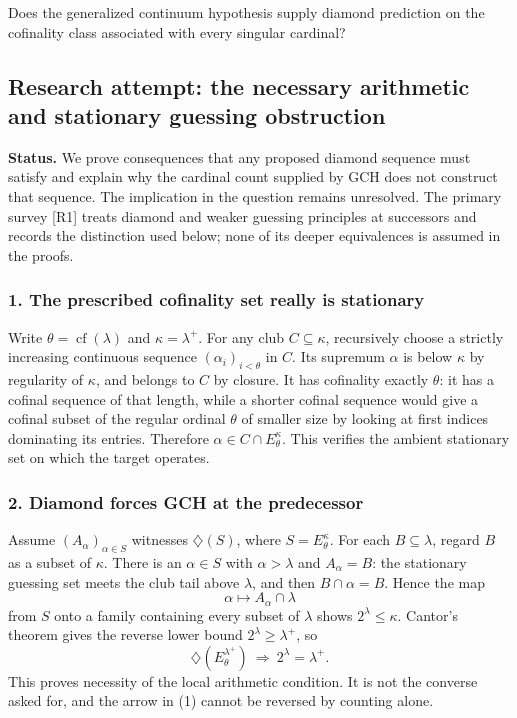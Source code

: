 \documentclass[11pt,a4paper]{article}
\begin{document}
Does the generalized continuum hypothesis supply diamond prediction on the cofinality class associated with every singular cardinal?

\subsection{Research attempt: the necessary arithmetic and stationary guessing obstruction}
\textbf{Status.} We prove consequences that any proposed diamond sequence must satisfy and explain why the cardinal count supplied by GCH does not construct that sequence. The implication in the question remains unresolved. The primary survey [R1] treats diamond and weaker guessing principles at successors and records the distinction used below; none of its deeper equivalences is assumed in the proofs.

\subsubsection{1. The prescribed cofinality set really is stationary}
Write $\theta=\operatorname{cf}(\lambda)$ and $\kappa=\lambda^+$. For any club $C\subseteq\kappa$, recursively choose a strictly increasing continuous sequence $(\alpha_i)_{i<\theta}$ in $C$. Its supremum $\alpha$ is below $\kappa$ by regularity of $\kappa$, and belongs to $C$ by closure. It has cofinality exactly $\theta$: it has a cofinal sequence of that length, while a shorter cofinal sequence would give a cofinal subset of the regular ordinal $\theta$ of smaller size by looking at first indices dominating its entries. Therefore $\alpha\in C\cap E_\theta^\kappa$. This verifies the ambient stationary set on which the target operates.

\subsubsection{2. Diamond forces GCH at the predecessor}
Assume $(A_\alpha)_{\alpha\in S}$ witnesses $\diamondsuit(S)$, where $S=E_\theta^\kappa$. For each $B\subseteq\lambda$, regard $B$ as a subset of $\kappa$. There is an $\alpha\in S$ with $\alpha>\lambda$ and $A_\alpha=B$: the stationary guessing set meets the club tail above $\lambda$, and then $B\cap\alpha=B$. Hence the map
\[\alpha\longmapsto A_\alpha\cap\lambda\]
from $S$ onto a family containing every subset of $\lambda$ shows $2^\lambda\leq\kappa$. Cantor's theorem gives the reverse lower bound $2^\lambda\geq\lambda^+$, so
\[\diamondsuit(E_\theta^{\lambda^+})\ \Longrightarrow\ 2^\lambda=\lambda^+.
\tag{1}\]
This proves necessity of the local arithmetic condition. It is not the converse asked for, and the arrow in (1) cannot be reversed by counting alone.
\end{document}
